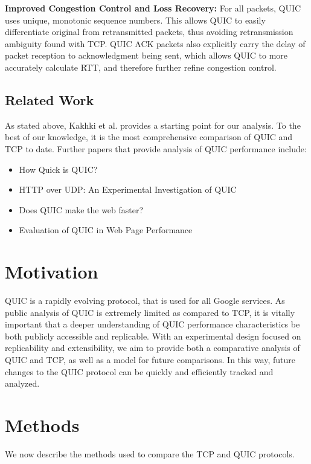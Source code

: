 \documentclass[12pt]{article}
\begin{document}
\textbf{Improved Congestion Control and Loss Recovery:} For all packets, QUIC uses unique, monotonic sequence numbers. This allows QUIC to easily differentiate original from retransmitted packets, thus avoiding retransmission ambiguity found with TCP. QUIC ACK packets also explicitly carry the delay of packet reception to acknowledgment being sent, which allows QUIC to more accurately calculate RTT, and therefore further refine congestion control\cite{quicLayout}.

\subsection{Related Work}
\label{background:related}
As stated above, Kakhki et al. provides a starting point for our analysis. To the best of our knowledge, it is the most comprehensive comparison of QUIC and TCP to date. Further papers that provide analysis of QUIC performance include:

\begin{itemize}
	\item How Quick is QUIC?\cite{Megysei:2016:HQQ}
	\item HTTP over UDP: An Experimental Investigation of QUIC\cite{Carlucci:2015:HOU}
	\item Does QUIC make the web faster?\cite{Biswal:2016:DQM}
	\item Evaluation of QUIC in Web Page Performance\cite{Das:2014:EQW}
\end{itemize}

\section{Motivation}
\label{motivation}
QUIC is a rapidly evolving protocol, that is used for all Google services. As public analysis of QUIC is extremely limited as compared to TCP, it is vitally important that a deeper understanding of QUIC performance characteristics be both publicly accessible and replicable. With an experimental design focused on replicability and extensibility, we aim to provide both a comparative analysis of QUIC and TCP, as well as a model for future comparisons. In this way, future changes to the QUIC protocol can be quickly and efficiently tracked and analyzed.

\section{Methods}
\label{methods}
We now describe the methods used to compare the TCP and QUIC protocols.
\end{document}
